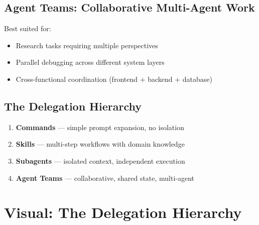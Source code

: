 \subsection{Agent Teams: Collaborative Multi-Agent Work}



Best suited for:
\begin{itemize}
  \item Research tasks requiring multiple perspectives
  \item Parallel debugging across different system layers
  \item Cross-functional coordination (frontend + backend + database)
\end{itemize}

\subsection{The Delegation Hierarchy}


\begin{enumerate}
  \item \textbf{Commands} --- simple prompt expansion, no isolation
  \item \textbf{Skills} --- multi-step workflows with domain knowledge
  \item \textbf{Subagents} --- isolated context, independent execution
  \item \textbf{Agent Teams} --- collaborative, shared state, multi-agent
\end{enumerate}

\section{Visual: The Delegation Hierarchy}

